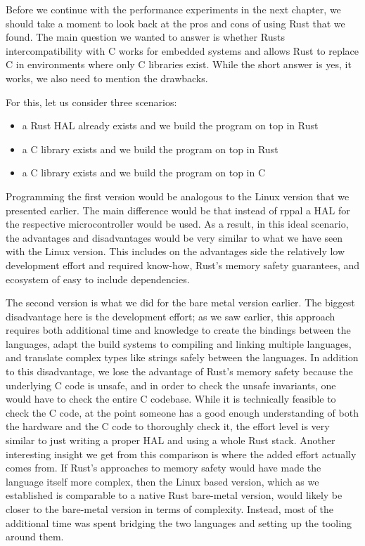 Before we continue with the performance experiments in the next chapter, we should take a moment to look back at the pros and cons of using Rust that we found.
The main question we wanted to answer is whether Rusts intercompatibility with C works for embedded systems and allows Rust to replace C in environments where only C libraries exist.
While the short answer is yes, it works, we also need to mention the drawbacks.

For this, let us consider three scenarios:
\begin{itemize}
    \item a Rust HAL already exists and we build the program on top in Rust
    \item a C library exists and we build the program on top in Rust
    \item a C library exists and we build the program on top in C
\end{itemize}

Programming the first version would be analogous to the Linux version that we presented earlier.
The main difference would be that instead of rppal a HAL for the respective microcontroller would be used.
As a result, in this ideal scenario, the advantages and disadvantages would be very similar to what we have seen with the Linux version.
This includes on the advantages side the relatively low development effort and required know-how, Rust's memory safety guarantees, and ecosystem of easy to include dependencies.

The second version is what we did for the bare metal version earlier.
The biggest disadvantage here is the development effort;
as we saw earlier, this approach requires both additional time and knowledge to create the bindings between the languages,
adapt the build systems to compiling and linking multiple languages, and translate complex types like strings safely between the languages.
In addition to this disadvantage, we lose the advantage of Rust's memory safety
because the underlying C code is unsafe, and in order to check the unsafe invariants, one would have to check the entire C codebase.
While it is technically feasible to check the C code,
at the point someone has a good enough understanding of both the hardware and the C code to thoroughly check it,
the effort level is very similar to just writing a proper HAL and using a whole Rust stack.
Another interesting insight we get from this comparison is where the added effort actually comes from.
If Rust's approaches to memory safety would have made the language itself more complex,
then the Linux based version,
which as we established is comparable to a native Rust bare-metal version,
would likely be closer to the bare-metal version in terms of complexity.
Instead, most of the additional time was spent bridging the two languages and setting up the tooling around them.

